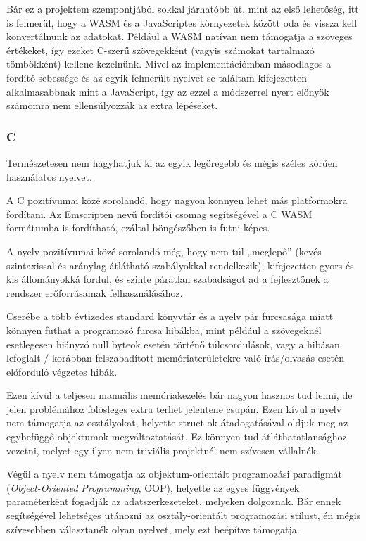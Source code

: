 Bár ez a projektem szempontjából sokkal járhatóbb út, mint az első lehetőség, itt is felmerül, hogy a WASM és a JavaScriptes környezetek között oda és vissza kell konvertálnunk az adatokat. Például a WASM natívan nem támogatja a szöveges értékeket\cite{wasmstring}, így ezeket C-szerű szövegekként (vagyis számokat tartalmazó tömbökként) kellene kezelnünk. Mivel az implementációmban másodlagos a fordító sebessége és az egyik felmerült nyelvet se találtam kifejezetten alkalmasabbnak mint a JavaScript, így az ezzel a módszerrel nyert előnyök számomra nem ellensúlyozzák az extra lépéseket.

\subsubsection{C}

Természetesen nem hagyhatjuk ki az egyik legöregebb és mégis széles körűen használatos nyelvet.

A C pozitívumai közé sorolandó, hogy nagyon könnyen lehet más platformokra fordítani. Az Emscripten nevű fordítói csomag segítségével a C WASM formátumba is fordítható, ezáltal böngészőben is futni képes.

A nyelv pozitívumai közé sorolandó még, hogy nem túl „meglepő” (kevés szintaxissal és aránylag átlátható szabályokkal rendelkezik), kifejezetten gyors és kis állományokká fordul, és szinte páratlan szabadságot ad a fejlesztőnek a rendszer erőforrásainak felhasználásához.

Cserébe a több évtizedes standard könyvtár és a nyelv pár furcsasága miatt könnyen futhat a programozó furcsa hibákba, mint például a szövegeknél esetlegesen hiányzó null byteok esetén történő túlcsordulások, vagy a hibásan lefoglalt / korábban felszabadított memóriaterületekre való írás/olvasás esetén előforduló végzetes hibák.

Ezen kívül a teljesen manuális memóriakezelés bár nagyon hasznos tud lenni, de jelen problémához fölösleges extra terhet jelentene csupán. Ezen kívül a nyelv nem támogatja az osztályokat, helyette struct-ok átadogatásával oldjuk meg az egybefüggő objektumok megváltoztatását. Ez könnyen tud átláthatatlansághoz vezetni, melyet egy ilyen nem-triviális projektnél nem szívesen vállalnék.

Végül a nyelv nem támogatja az objektum-orientált programozási paradigmát (\textit{Object-Oriented} \textit{Programming}, OOP), helyette az egyes függvények paraméterként fogadják az adatszerkezeteket, melyeken dolgoznak. Bár ennek segítségével lehetséges utánozni az osztály-orientált programozási stílust, én mégis szívesebben választanék olyan nyelvet, mely ezt beépítve támogatja.

